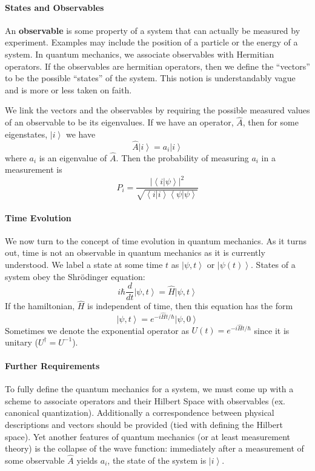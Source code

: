 \documentclass[10pt]{article}
\newcommand{\n}{\noindent}
\newcommand{\ket}[1]{\left|#1\right>}
\newcommand{\ip}[2]{\left<#1|#2\right>}
\newcommand{\norm}[1]{\left|#1\right|}
\begin{document}
	\paragraph{States and Observables} An \textbf{observable} is some property of a system that can actually be measured by experiment. Examples may include the position of a particle or the energy of a system. In quantum mechanics, we associate observables with Hermitian operators. If the observables are hermitian operators, then we define the ``vectors'' to be the possible ``states'' of the system. This notion is understandably vague and is more or less taken on faith.
	
	\n We link the vectors and the observables by requiring the possible measured values of an observable to be its eigenvalues. If we have an operator, $\hat{A}$, then for some eigenstates, $\ket{i}$ we have
	$$\hat{A}\ket{i} = a_i\ket{i}$$
	where $a_i$ is an eigenvalue of $\hat{A}$. Then the probability of measuring $a_i$ in a measurement is
	$$P_i = \frac{\norm{\ip{i}{\psi}}^2}{\sqrt{\ip{i}{i}\ip{\psi}{\psi}}}$$
	\paragraph{Time Evolution} We now turn to the concept of time evolution in quantum mechanics. As it turns out, time is not an observable in quantum mechanics as it is currently understood. We label a state at some time $t$ as $\ket{\psi, t}$ or $\ket{\psi(t)}$. States of a system obey the Shr\"{o}dinger equation:
	\begin{equation} \label{Schro1} i\hbar \frac{d}{dt}\ket{\psi,t} = \hat{H}\ket{\psi,t}\end{equation}
	If the hamiltonian, $\hat{H}$ is independent of time, then this equation has the form
	\begin{equation} \label{Schro2} \ket{\psi,t} = e^{-i\hat{H}t/\hbar}\ket{\psi,0}\end{equation}
	Sometimes we denote the exponential operator as $U(t) = e^{-i\hat{H}t/\hbar}$ since it is unitary ($U^\dag = U^{-1}$).
	\paragraph{Further Requirements} To fully define the quantum mechanics for a system, we must come up with a scheme to associate operators and their Hilbert Space with observables (ex. canonical quantization). Additionally a correspondence between physical descriptions and vectors should be provided (tied with defining the Hilbert space). Yet another features of quantum mechanics (or at least measurement theory) is the collapse of the wave function: immediately after a measurement of some observable $\hat{A}$ yields $a_i$, the state of the system is $\ket{i}$.
\end{document}
